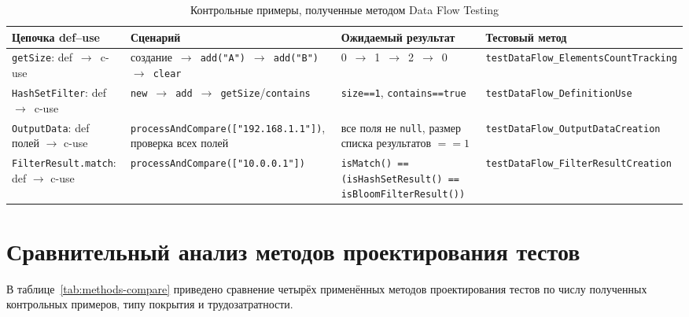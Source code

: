 \begin{table}[ht]
\centering\small
\caption{Контрольные примеры, полученные методом Data Flow Testing}
\label{tab:dataflow-cases}
\begin{tabular}{|p{5.2cm}|p{4.2cm}|p{3.4cm}|p{3.5cm}|}
\hline
\textbf{Цепочка def--use} & \textbf{Сценарий} & \textbf{Ожидаемый результат} & \textbf{Тестовый метод} \\
\hline
\texttt{getSize}: def~$\to$~c-use & создание~$\to$~\texttt{add("A")}~$\to$~\texttt{add("B")}~$\to$~\texttt{clear} & 0~$\to$~1~$\to$~2~$\to$~0 & \texttt{testData\-Flow\_Elements\-Count\-Tracking} \\
\hline
\texttt{HashSetFilter}: def~$\to$~c-use & \texttt{new}~$\to$~\texttt{add}~$\to$~\texttt{getSize}/\texttt{contains} & \texttt{size==1}, \texttt{contains==true} & \texttt{testData\-Flow\_Definition\-Use} \\
\hline
\texttt{OutputData}: def полей $\to$ c-use & \texttt{processAndCompare(["192.168.1.1"])}, проверка всех полей & все поля не \texttt{null}, размер списка результатов $==1$ & \texttt{testData\-Flow\_Output\-Data\-Creation} \\
\hline
\texttt{FilterResult.match}: def $\to$ c-use & \texttt{processAndCompare(["10.0.0.1"])} & \texttt{isMatch() == (isHashSet\-Result() == isBloom\-FilterResult())} & \texttt{testData\-Flow\_Filter\-Result\-Creation} \\
\hline
\end{tabular}
\end{table}

\section{Сравнительный анализ методов проектирования тестов} \label{ch3:sec3}

В таблице~\ref{tab:methods-compare} приведено сравнение четырёх применённых методов проектирования тестов по числу полученных контрольных примеров, типу покрытия и трудозатратности.

